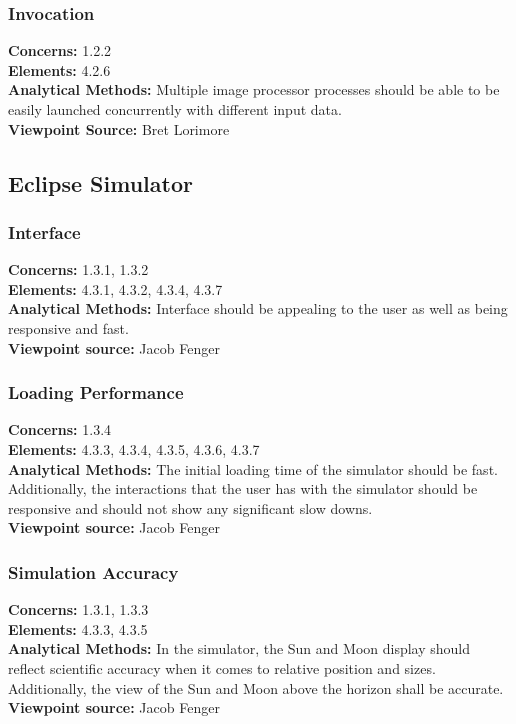 \documentclass[10pt, onecolumn, draftclsnofoot, letterpaper, compsoc]{IEEEtran}
\begin{document}
    \subsubsection{Invocation}
    \textbf{Concerns:} 1.2.2 \\
    \textbf{Elements:} 4.2.6 \\
    \textbf{Analytical Methods:} Multiple image processor processes should be able to be easily launched
    concurrently with different input data. \\
    \textbf{Viewpoint Source:} Bret Lorimore \\

\subsection{Eclipse Simulator}
  \subsubsection{Interface}
  \textbf{Concerns:} 1.3.1, 1.3.2 \\
  \textbf{Elements:} 4.3.1, 4.3.2, 4.3.4, 4.3.7 \\
  \textbf{Analytical Methods:} Interface should be appealing
  to the user as well as being responsive and fast. \\
  \textbf{Viewpoint source:} Jacob Fenger \\

  \subsubsection{Loading Performance}
  \textbf{Concerns:} 1.3.4\\
  \textbf{Elements:} 4.3.3, 4.3.4, 4.3.5, 4.3.6, 4.3.7 \\
  \textbf{Analytical Methods:} The initial loading time
  of the simulator should be fast. Additionally, the
  interactions that the user has with the simulator should
  be responsive and should not show any significant slow
  downs. \\
  \textbf{Viewpoint source:} Jacob Fenger \\

  \subsubsection{Simulation Accuracy}
  \textbf{Concerns:} 1.3.1, 1.3.3 \\
  \textbf{Elements:} 4.3.3, 4.3.5 \\
  \textbf{Analytical Methods:} In the simulator, the Sun and
  Moon display should reflect scientific accuracy when it
  comes to relative position and sizes. Additionally, the
  view of the Sun and Moon above the horizon shall be
  accurate.\\
  \textbf{Viewpoint source:} Jacob Fenger \\
\end{document}
